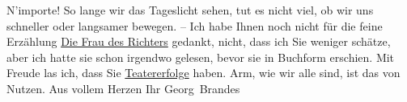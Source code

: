 \begin{ledgroupsized}[t]{13cm}
           N’importe! So lange wir das Tageslicht sehen, tut es nicht viel, ob wir uns schneller
               oder langsamer bewegen. – Ich habe Ihnen noch nicht für die feine Erzählung \uline{Die Frau des Richters} gedankt, nicht, dass ich Sie weniger schätze, aber ich hatte sie schon irgendwo
               gelesen, bevor sie in Buchform erschien. Mit Freude las ich, dass Sie \uline{Teatererfolge} haben. Arm, wie wir alle sind, ist das
               von Nutzen. Aus vollem Herzen\pend
           \pstart Ihr \spacefill\mbox{Georg Brandes}\pend{}
         
         \endnumbering{}\end{ledgroupsized}  \newcommand{\dateiname}{L02462}\newcommand{\titel}{Georg Brandes an Arthur Schnitzler, 30. 12. 1925}\newcommand{\editorInnen}{Martin Anton Müller und Gerd-Hermann Susen}
      